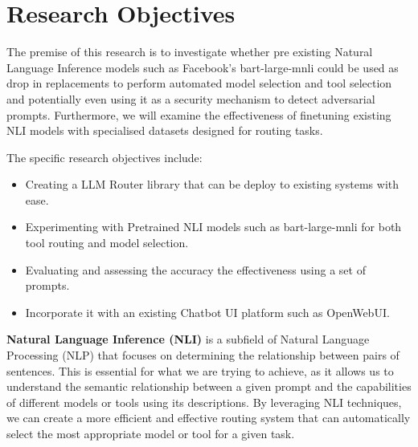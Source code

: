 \section{Research Objectives}
\label{sec:intro_aims_obj}

The premise of this research is to investigate whether pre existing Natural Language Inference models such as Facebook's bart-large-mnli could be used as drop in replacements to perform automated model selection and tool selection and potentially even using it as a security mechanism to detect adversarial prompts. Furthermore, we will examine the effectiveness of finetuning existing NLI models with specialised datasets designed for routing tasks.

The specific research objectives include:
\begin{itemize}
    \item Creating a LLM Router library that can be deploy to existing systems with ease.
    \item Experimenting with Pretrained NLI models such as bart-large-mnli for both tool routing and model selection.
    \item Evaluating and assessing the accuracy the effectiveness using a set of prompts.
    \item Incorporate it with an existing Chatbot UI platform such as OpenWebUI.
\end{itemize}


\textbf{Natural Language Inference (NLI)} is a subfield of Natural Language Processing (NLP) that focuses on determining the relationship between pairs of sentences. This is essential for what we are trying to achieve, as it allows us to understand the semantic relationship between a given prompt and the capabilities of different models or tools using its descriptions. By leveraging NLI techniques, we can create a more efficient and effective routing system that can automatically select the most appropriate model or tool for a given task.


